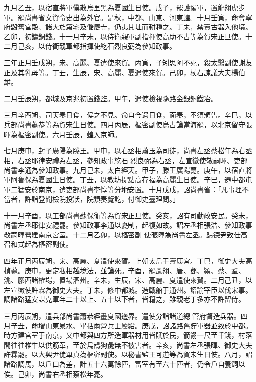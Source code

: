 \begin{pinyinscope}
 九月乙丑，以宿直將軍僕散烏里黑為夏國生日使。戊子，罷護駕軍，置龍翔虎步軍。罷尚書省文資令史出為外官。是秋，中都、山東、河東蝗。十月壬寅，命會寧府毀舊宮殿、諸大族第宅及儲慶寺，仍夷其址而耕種之。丁未，禁賣古器入他境。乙卯，初鑄銅錢。十一月辛未，以侍衛親軍副指揮使高助不古等為賀宋正旦使。十二月己亥，以侍衛親軍都指揮使紇石烈良弼為參知政事。



 三年正月壬戌朔，宋、高麗、夏遣使來賀。丙寅，子矧思阿不死，殺太醫副使謝友正及其乳母等。丁丑，生辰，宋、高麗、夏遣使來賀。己卯，杖右諫議大夫楊伯雄。



 二月壬辰朔，都城及京兆初置錢監。甲午，遣使檢視隨路金銀銅鐵冶。



 三月辛酉朔，司天奏日食，侯之不見。命自今遇日食，面奏，不須頒告。辛巳，以兵部尚書蕭恭等為賀宋生日使。四月丙辰，樞密副使烏古論當海罷，以北京留守張暉為樞密副使。六月壬辰，蝗入京師。



 七月庚申，封子廣陽為滕王。甲申，以右丞相蕭玉為司徒，尚書左丞蔡松年為右丞相，右丞耶律安禮為左丞，參知政事紇石
 烈良弼為右丞，左宣徽使敬嗣暉、吏部尚書李通為參知政事。九月己未，太白經天。甲子，滕王廣陽薨。庚午，以宿直將軍阿魯保為夏國生日使。丁丑，以教坊提點高存福為高麗生日使。辛巳，遷中都屯軍二猛安於南京，遣吏部尚書李惇等分地安置。十月戊戌，詔尚書省：「凡事理不當者，許詣登聞檢院投狀，院類奏覽訖，付御史臺理問。」



 十一月辛酉，以工部尚書蘇保衡等為賀宋正旦使。癸亥，詔有司勤政安民。癸未，尚書左丞耶律安禮罷。參知政事李通以憂制，起復如故。詔左丞相張浩、參知政事敬嗣暉營建南京宮室。十二月乙卯，以樞密副
 使張暉為尚書左丞。歸德尹致仕高召和式起為樞密副使。



 四年正月丙辰朔，宋、高麗、夏遣使來賀。上朝太后于壽康宮。丁巳，御史大夫高楨薨。庚申，更定私相越境法，並論死。辛酉，罷鳳翔、唐、鄧、潁、蔡、鞏、洮、膠西諸榷場，置場泗州。辛未，生辰，宋、高麗、夏遣使來賀。二月己丑，以左宣徽使許霖為御史大夫。丁未，修中都城。造戰船于通州。詔諭宰臣以伐宋事。調諸路猛安謀克軍年二十以上、五十以下者，皆籍之，雖親老丁多亦不許留侍。



 三月丙辰朔，遣兵部尚書蕭恭經畫夏國邊界。遣使分詣諸道總
 管府督造兵器。四月辛丑，命增山東泉水、畢括兩營兵士廩給。庚戌，詔諸路舊貯軍器並致於中都。時方建宮室于南京，又中都與四方所造軍器材用皆賦於民，箭翎一尺至千錢，村落間往往椎牛以供筋革，至於烏鵲狗彘無不被害者。辛亥，尚書左丞張暉、御史大夫許霖罷。以大興尹徒單貞為樞密副使。以秘書監王可道等為賀宋生日使。八月，詔諸路調馬，以戶口為差，計五十六萬餘匹，富室有至六十匹者，仍令戶自養飼以俟。己卯，尚書右丞相蔡松年薨。




\end{pinyinscope}
